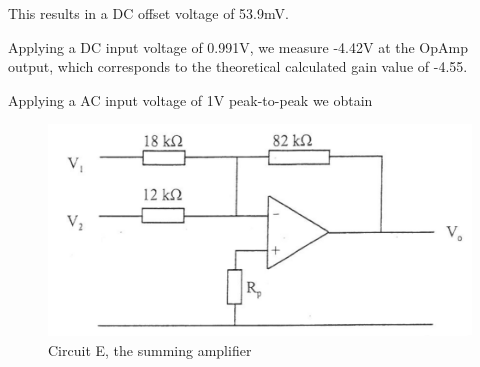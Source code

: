 This results in a DC offset voltage of 53.9mV.

Applying a DC input voltage of 0.991V, we measure -4.42V at the OpAmp output, which corresponds to the theoretical calculated gain value of -4.55.

Applying a AC input voltage of 1V peak-to-peak we obtain 





\begin{figure}[H] %
\begin{center}
\includegraphics[width=1\linewidth]{LabTwo/e}
\end{center}
\caption{Circuit E, the summing amplifier}
\label{fig:2_summing}
\end{figure}

